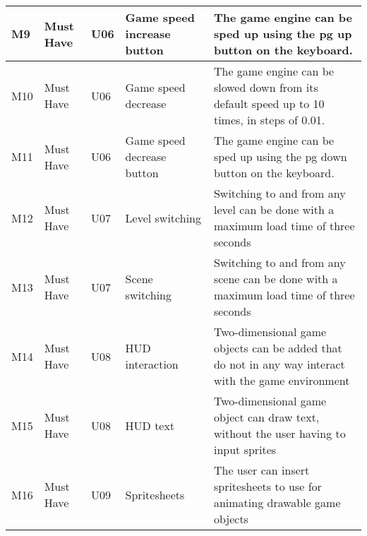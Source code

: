 \documentclass{article} %
\begin{document}
\begin{longtable}{|p{}|p{}|p{}|p{}|p{}|}
    M9                          & Must Have                          & U06                & Game speed increase button  & The game engine can be sped up using the pg up button on the keyboard.                                                                                      \\ \hline
    M10                         & Must Have                          & U06                & Game speed decrease         & The game engine can be slowed down from its default speed up to 10 times, in steps of 0.01.                                                                 \\ \hline
    M11                         & Must Have                          & U06                & Game speed decrease button  & The game engine can be sped up using the pg down button on the keyboard.                                                                                    \\ \hline
    M12                         & Must Have                          & U07                & Level switching             & Switching to and from any level can be done with a maximum load time of three seconds                                                                       \\ \hline
    M13                         & Must Have                          & U07                & Scene switching             & Switching to and from any scene can be done with a maximum load time of three seconds                                                                       \\ \hline
    M14                         & Must Have                          & U08                & HUD interaction             & Two-dimensional game objects can be added that do not in any way interact with the game environment                                                         \\ \hline
    M15                         & Must Have                          & U08                & HUD text                    & Two-dimensional game object can draw text, without the user having to input sprites                                                                         \\ \hline
    M16                         & Must Have                          & U09                & Spritesheets                & The user can insert spritesheets to use for animating drawable game objects                                                                                 \\ \hline

\end{longtable}
\end{document}
